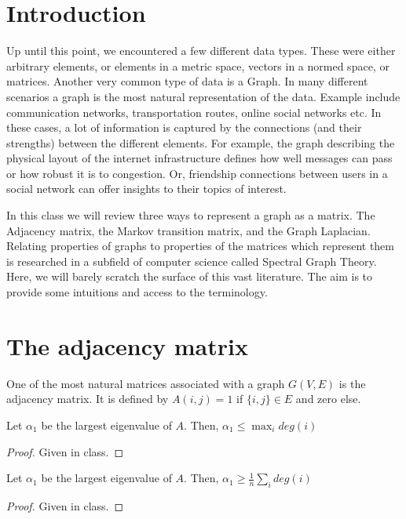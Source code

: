 \documentclass{article}
\begin{document}

\section{Introduction}
Up until this point, we encountered a few different data types.
These were either arbitrary elements, or elements in a metric space, vectors in a normed space, or matrices.
Another very common type of data is a Graph.
In many different scenarios a graph is the most natural representation of the data.
Example include communication networks, transportation routes, online social networks etc.
In these cases, a lot of information is captured by the connections (and their strengths) between the different elements.
For example, the graph describing the physical layout of the internet infrastructure defines how well messages can pass
or how robust it is to congestion. 
Or, friendship connections between users in a social network can offer insights to their topics of interest.

In this class we will review three ways to represent a graph as a matrix.
The Adjacency matrix, the Markov transition matrix, and the Graph Laplacian.
Relating properties of graphs to properties of the matrices which represent them is 
researched in a subfield of computer science called Spectral Graph Theory.
Here, we will barely scratch the surface of this vast literature.
The aim is to provide some intuitions and access to the terminology.

\section{The adjacency matrix}
One of the most natural matrices associated with a graph $G(V,E)$ is the adjacency matrix.
It is defined by $A(i,j) = 1$ if $\{i,j\} \in E$ and zero else.

\begin{fact}
Let $\alpha_1$ be the largest eigenvalue of $A$. Then, $\alpha_1 \le \max_i deg(i)$ 
\end{fact}
\begin{proof}
Given in class.
\end{proof}

\begin{fact}
Let $\alpha_1$ be the largest eigenvalue of $A$. Then, $\alpha_1 \ge \frac{1}{n} \sum_{i}deg(i)$ 
\end{fact}
\begin{proof}
Given in class.
\end{proof}
\end{document}
